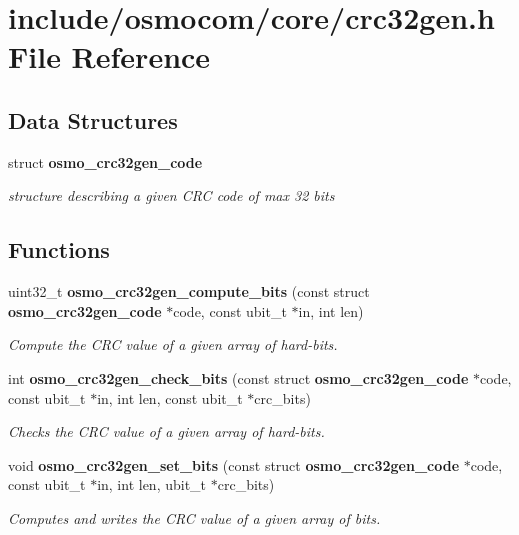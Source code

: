 \section{include/osmocom/core/crc32gen.h File Reference}
\label{crc32gen_8h}
\subsection*{Data Structures}
\begin{DoxyCompactItemize}
\item 
struct \textbf{ osmo\+\_\+crc32gen\+\_\+code}
\begin{DoxyCompactList}\small\item\em structure describing a given C\+RC code of max 32 bits \end{DoxyCompactList}\end{DoxyCompactItemize}
\subsection*{Functions}
\begin{DoxyCompactItemize}
\item 
uint32\+\_\+t \textbf{ osmo\+\_\+crc32gen\+\_\+compute\+\_\+bits} (const struct \textbf{ osmo\+\_\+crc32gen\+\_\+code} $\ast$code, const ubit\+\_\+t $\ast$in, int len)
\begin{DoxyCompactList}\small\item\em Compute the C\+RC value of a given array of hard-\/bits. \end{DoxyCompactList}\item 
int \textbf{ osmo\+\_\+crc32gen\+\_\+check\+\_\+bits} (const struct \textbf{ osmo\+\_\+crc32gen\+\_\+code} $\ast$code, const ubit\+\_\+t $\ast$in, int len, const ubit\+\_\+t $\ast$crc\+\_\+bits)
\begin{DoxyCompactList}\small\item\em Checks the C\+RC value of a given array of hard-\/bits. \end{DoxyCompactList}\item 
void \textbf{ osmo\+\_\+crc32gen\+\_\+set\+\_\+bits} (const struct \textbf{ osmo\+\_\+crc32gen\+\_\+code} $\ast$code, const ubit\+\_\+t $\ast$in, int len, ubit\+\_\+t $\ast$crc\+\_\+bits)
\begin{DoxyCompactList}\small\item\em Computes and writes the C\+RC value of a given array of bits. \end{DoxyCompactList}\end{DoxyCompactItemize}
